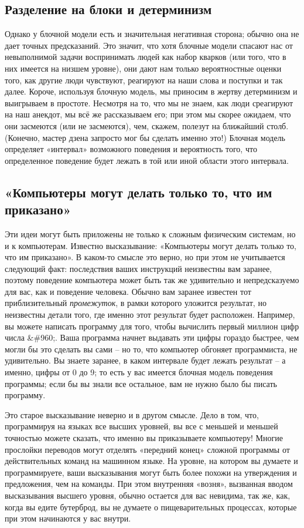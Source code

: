 \documentclass[../main.tex]{subfiles}
\begin{document}
\subsection{Разделение на блоки и детерминизм}

Однако у блочной модели есть и значительная негативная сторона; обычно она не дает точных предсказаний. Это значит, что хотя блочные модели спасают нас от невыполнимой задачи воспринимать людей как набор кварков (или того, что в них имеется на низшем уровне), они дают нам только вероятностные оценки того, как другие люди чувствуют, реагируют на наши слова и поступки и так далее. Короче, используя блочную модель, мы приносим в жертву детерминизм и выигрываем в простоте. Несмотря на то, что мы не знаем, как люди среагируют на наш анекдот, мы всё же рассказываем его; при этом мы скорее ожидаем, что они засмеются (или не засмеются), чем, скажем, полезут на ближайший столб. (Конечно, мастер дзена запросто мог бы сделать именно это!) Блочная модель определяет «интервал» возможного поведения и вероятность того, что определенное поведение будет лежать в той или иной области этого интервала.


\subsection{«Компьютеры могут делать только то, что им приказано»}

Эти идеи могут быть приложены не только к сложным физическим системам, но и к компьютерам. Известно высказывание: «Компьютеры могут делать только то, что им приказано». В каком-то смысле это верно, но при этом не учитывается следующий факт: последствия ваших инструкций неизвестны вам заранее, поэтому поведение компьютера может быть так же удивительно и непредсказуемо для вас, как и поведение человека. Обычно вам заранее известен тот приблизительный \emph{промежуток}, в рамки которого уложится результат, но неизвестны детали того, где именно этот результат будет расположен. Например, вы можете написать программу для того, чтобы вычислить первый миллион цифр числа \&\#960;. Ваша программа начнет выдавать эти цифры гораздо быстрее, чем могли бы это сделать вы сами \--- но то, что компьютер обгоняет программиста, не удивительно. Вы знаете заранее, в каком интервале будет лежать результат \--- а именно, цифры от 0 до 9; то есть у вас имеется блочная модель поведения программы; если бы вы знали все остальное, вам не нужно было бы писать программу.

Это старое высказывание неверно и в другом смысле. Дело в том, что, программируя на языках все высших уровней, вы все с меньшей и меньшей точностью можете сказать, что именно вы приказываете компьютеру! Многие прослойки переводов могут отделять «передний конец» сложной программы от действительных команд на машинном языке. На уровне, на котором вы думаете и программируете, ваши высказывания могут быть более похожи на утверждения и предложения, чем на команды. При этом внутренняя «возня», вызванная вводом высказывания высшего уровня, обычно остается для вас невидима, так же, как, когда вы едите бутерброд, вы не думаете о пищеварительных процессах, которые при этом начинаются у вас внутри.
\end{document}
